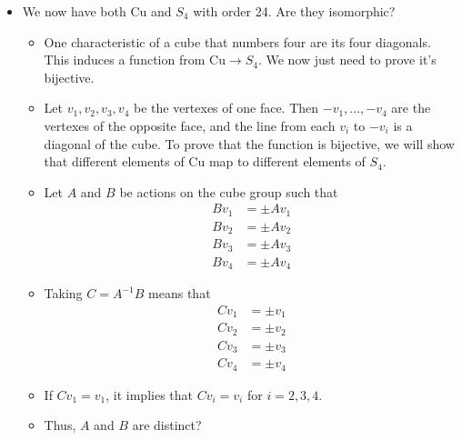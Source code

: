 \documentclass[../notes.tex]{subfiles}
\begin{document}
\begin{itemize}
\begin{itemize}
    \end{itemize}
    \item We now have both Cu and $S_4$ with order 24. Are they isomorphic?
    \begin{itemize}
        \item One characteristic of a cube that numbers four are its four diagonals. This induces a function from $\text{Cu}\to S_4$. We now just need to prove it's bijective.
        \item Let $v_1,v_2,v_3,v_4$ be the vertexes of one face. Then $-v_1,\dots,-v_4$ are the vertexes of the opposite face, and the line from each $v_i$ to $-v_i$ is a diagonal of the cube. To prove that the function is bijective, we will show that different elements of Cu map to different elements of $S_4$.
        \item Let $A$ and $B$ be actions on the cube group such that
        \begin{align*}
            Bv_1 &= \pm Av_1\\
            Bv_2 &= \pm Av_2\\
            Bv_3 &= \pm Av_3\\
            Bv_4 &= \pm Av_4
        \end{align*}
        \item Taking $C=A^{-1}B$ means that
        \begin{align*}
            Cv_1 &= \pm v_1\\
            Cv_2 &= \pm v_2\\
            Cv_3 &= \pm v_3\\
            Cv_4 &= \pm v_4
        \end{align*}
        \item If $Cv_1=v_1$, it implies that $Cv_i=v_i$ for $i=2,3,4$.
        \item Thus, $A$ and $B$ are distinct?
    \end{itemize}
\end{itemize}
\end{document}
